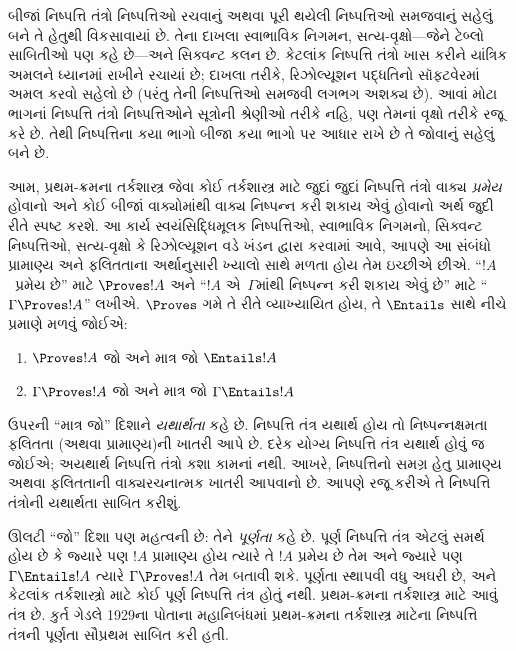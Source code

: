 બીજાં નિષ્પત્તિ તંત્રો નિષ્પત્તિઓ રચવાનું અથવા પૂરી થયેલી
નિષ્પત્તિઓ સમજવાનું સહેલું બને તે હેતુથી વિકસાવાયાં છે. તેના
દાખલા સ્વાભાવિક નિગમન, સત્ય-વૃક્ષો—જેને ટેબ્લો સાબિતીઓ પણ કહે
છે—અને સિક્વન્ટ કલન છે. કેટલાંક નિષ્પત્તિ તંત્રો ખાસ કરીને
યાંત્રિક અમલને ધ્યાનમાં રાખીને રચાયાં છે; દાખલા તરીકે, રિઝોલ્યૂશન
પદ્ધતિનો સૉફ્ટવેરમાં અમલ કરવો સહેલો છે (પરંતુ તેની નિષ્પત્તિઓ
સમજવી લગભગ અશક્ય છે). આવાં મોટા ભાગનાં નિષ્પત્તિ તંત્રો
નિષ્પત્તિઓને સૂત્રોની
શ્રેણીઓ તરીકે નહિ, પણ તેમનાં વૃક્ષો તરીકે રજૂ કરે છે.
તેથી નિષ્પત્તિના કયા ભાગો બીજા કયા ભાગો પર આધાર રાખે છે તે
જોવાનું સહેલું બને છે.

આમ, પ્રથમ-ક્રમના તર્કશાસ્ત્ર જેવા કોઈ તર્કશાસ્ત્ર માટે જુદાં જુદાં
નિષ્પત્તિ તંત્રો વાક્ય \emph{પ્રમેય} હોવાનો અને કોઈ
બીજાં વાક્યોમાંથી વાક્ય નિષ્પન્ન કરી શકાય એવું હોવાનો અર્થ જુદી
રીતે સ્પષ્ટ કરશે. આ કાર્ય સ્વયંસિદ્ધિમૂલક નિષ્પત્તિઓ, સ્વાભાવિક
નિગમનો, સિક્વન્ટ નિષ્પત્તિઓ, સત્ય-વૃક્ષો કે રિઝોલ્યૂશન વડે ખંડન
દ્વારા કરવામાં આવે, આપણે આ સંબંધો પ્રામાણ્ય અને ફલિતતાના અર્થાનુસારી
ખ્યાલો સાથે મળતા હોય તેમ ઇચ્છીએ છીએ. ``$!A$~પ્રમેય છે'' માટે
$\Proves !A$ અને ``$!A$ એ~$\Gamma$માંથી નિષ્પન્ન કરી શકાય એવું છે'' માટે
``$\Gamma \Proves !A$'' લખીએ. $\Proves$ ગમે તે રીતે વ્યાખ્યાયિત હોય,
તે $\Entails$ સાથે નીચે પ્રમાણે મળવું જોઈએ:
\begin{enumerate}
\item $\Proves !A$ જો અને માત્ર જો $\Entails !A$
\item $\Gamma \Proves !A$ જો અને માત્ર જો $\Gamma \Entails !A$
\end{enumerate}
ઉપરની ``માત્ર જો'' દિશાને \emph{યથાર્થતા} કહે છે. નિષ્પત્તિ
તંત્ર યથાર્થ હોય તો નિષ્પન્નક્ષમતા ફલિતતા (અથવા પ્રામાણ્ય)ની ખાતરી
આપે છે. દરેક યોગ્ય નિષ્પત્તિ તંત્ર યથાર્થ હોવું જ જોઈએ;
અયથાર્થ નિષ્પત્તિ તંત્રો કશા કામનાં નથી. આખરે,
નિષ્પત્તિનો સમગ્ર હેતુ
પ્રામાણ્ય અથવા ફલિતતાની વાક્યરચનાત્મક ખાતરી આપવાનો છે. આપણે રજૂ
કરીએ તે નિષ્પત્તિ તંત્રોની યથાર્થતા સાબિત કરીશું.

ઊલટી ``જો'' દિશા પણ મહત્વની છે: તેને \emph{પૂર્ણતા} કહે છે. પૂર્ણ
નિષ્પત્તિ તંત્ર એટલું સમર્થ હોય છે કે જ્યારે પણ $!A$ પ્રામાણ્ય
હોય ત્યારે તે $!A$ પ્રમેય છે તેમ અને જ્યારે પણ $\Gamma \Entails !A$
ત્યારે $\Gamma \Proves !A$ તેમ બતાવી શકે. પૂર્ણતા સ્થાપવી વધુ અઘરી
છે, અને કેટલાંક તર્કશાસ્ત્રો માટે કોઈ પૂર્ણ નિષ્પત્તિ તંત્ર હોતું
નથી. પ્રથમ-ક્રમના તર્કશાસ્ત્ર માટે આવું તંત્ર છે. કુર્ત ગેડલે 1929ના
પોતાના મહાનિબંધમાં પ્રથમ-ક્રમના તર્કશાસ્ત્ર માટેના નિષ્પત્તિ
તંત્રની પૂર્ણતા સૌપ્રથમ સાબિત કરી હતી.

